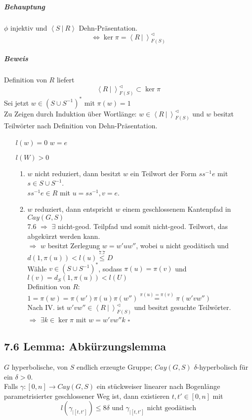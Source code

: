 \documentclass{article}
\newcommand{\grp}[2]{\left\langle #1~|~#2 \right\rangle}
\newcommand{\qed}{\hfill $\square$}
\begin{document}
\subparagraph{Behauptung} $\phi$ injektiv und $\grp{S}{R}$ Dehn-Präsentation.
\[\Longleftrightarrow \ker \pi  = \grp{R}{}_{F(S)}^\vartriangleleft \]
\subparagraph{Beweis}
Definition von $R$ liefert
\[ \grp{R}{}_{F(S)}^\vartriangleleft \subset \ker \pi \]
Sei jetzt $w \in (S\cup S^{-1})^*$ mit $\pi(w) = 1$\\
Zu Zeigen durch Induktion über Wortlänge: $w \in \grp{R}{}_{F(S)}^\vartriangleleft$ und $w$ besitzt Teilwörter nach Definition von Dehn-Präsentation.\\
\begin{enumerate}
	\item[$l(w) = 0$ ] $w = e$
	\item[$l(W) > 0$] 
	\begin{enumerate}
		\item $w$ nicht reduziert, dann besitzt $w$ ein Teilwort der Form $ss^{-1}e$ mit $s \in S\cup S^{-1}$.\\
		$ss^{-1}e \in R$ mit $u = ss^{-1}, v = e$.
		\item $w$ reduziert, dann entspricht $w$ einem geschlossenem Kantenpfad in $Cay(G,S)$\\
		7.6 $\Longrightarrow$ $\exists$ nicht-geod. Teilpfad und somit nicht-geod. Teilwort, das abgekürzt werden kann.\\
		$\Longrightarrow$ $w$ besitzt Zerlegung $w = w'uw''$, wobei $u$ nicht geodätisch und $d(1, \pi(u)) < l(u) \overset{7.7}{\leq} D$\\
		Wähle $v \in (S\cup S^{-1})^*$, sodass $\pi(u) = \pi(v)$ und $l(v) = d_S(1, \pi(u))< l(U)$\\
		Definition von $R$: $1 = \pi(w) = \pi(w') \pi(u) \pi(w'') \overset{\pi(u) = \pi(v)}{=} \pi(w'vw'') $\\
		Nach IV. ist $w'vw'' \in \grp{R}{}_{F(S)}^\vartriangleleft$ und besitzt gesuchte Teilwörter.\\
		$\Longrightarrow$ $\exists k \in \ker \pi $ mit $w = w'vw''k$ \qed
	\end{enumerate}
\end{enumerate}

\subsection{7.6 Lemma: Abkürzungslemma}
$G$ hyperbolische, von $S$ endlich erzeugte Gruppe; $Cay(G,S)$ $\delta$-hyperbolisch für ein $\delta > 0$.\\
Falls $\gamma : [0,n] \rightarrow Cay(G,S)$ ein stückweiser linearer nach Bogenlänge parametrisierter geschlossener Weg ist, dann existieren $t,t'\in [0,n]$ mit 
\[l(\gamma_{|[t,t']}) \leq 8\delta \text{ und } \gamma_{|[t,t']} \text{ nicht geodätisch} \]
\end{document}
